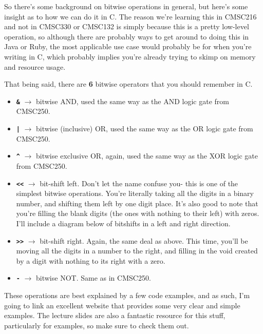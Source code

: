 \documentclass[english, 10pt]{article}
\begin{document}
So there's some background on bitwise operations in general, but here's some insight as to how we can do it in C. The reason we're learning this in CMSC216 and not in CMSC330 or CMSC132 is simply because this is a pretty low-level operation, so although there are probably ways to get around to doing this in Java or Ruby, the most applicable use case would probably be for when you're writing in C, which probably implies you're already trying to skimp on memory and resource usage.\newline

That being said, there are \textbf{6} bitwise operators that you should remember in C.\newline

\begin{itemize}
	\item \textbf{\texttt{\&}} $\rightarrow$ bitwise AND, used the same way as the AND logic gate from CMSC250.
	\item \textbf{\texttt{|}} $\rightarrow$ bitwise (inclusive) OR, used the same way as the OR logic gate from CMSC250.
	\item \textbf{\texttt{\^}} $\rightarrow$ bitwise exclusive OR, again, used the same way as the XOR logic gate from CMSC250.
	\item \textbf{\texttt{<<}} $\rightarrow$ bit-shift left. Don't let the name confuse you- this is one of the simplest bitwise operations. You're literally taking all the digits in a binary number, and shifting them left by one digit place. It's also good to note that you're filling the blank digits (the ones with nothing to their left) with zeros. I'll include a diagram below of bitshifts in a left and right direction.
	\item \textbf{\texttt{>>}} $\rightarrow$ bit-shift right. Again, the same deal as above. This time, you'll be moving all the digits in a number to the right, and filling in the void created by a digit with nothing to its right with a zero.
	\item \textbf{\texttt{-}} $\rightarrow$ bitwise NOT. Same as in CMSC250.
	
\end{itemize}

These operations are best explained by a few code examples, and as such, I'm going to link an excellent website that provides some very clear and simple examples. The lecture slides are also a fantastic resource for this stuff, particularly for examples, so make sure to check them out.\newline
\end{document}
